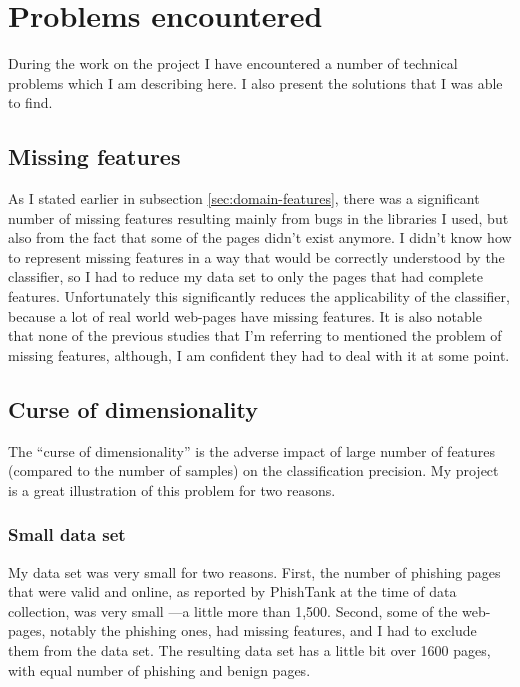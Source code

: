 \documentclass{article}
\begin{document}
\section{Problems encountered}
\label{sec:problems-encountered}

During the work on the project I have encountered a number of
technical problems which I am describing here. I also present the
solutions that I was able to find.

\subsection{Missing features}
\label{sec:missing-features}

As I stated earlier in subsection \ref{sec:domain-features}, there was
a significant number of missing features resulting mainly from bugs in
the libraries I used, but also from the fact that some of the pages
didn't exist anymore. I didn't know how to represent missing features
in a way that would be correctly understood by the classifier, so I
had to reduce my data set to only the pages that had complete
features. Unfortunately this significantly reduces the applicability
of the classifier, because a lot of real world web-pages have missing
features. It is also notable that none of the previous studies that
I'm referring to mentioned the problem of missing features, although,
I am confident they had to deal with it at some point.

\subsection{Curse of dimensionality}
\label{sec:curse-dimensionality}

The ``curse of dimensionality'' is the adverse impact of large number
of features (compared to the number of samples) on the classification
precision. My project is a great illustration of this problem for two
reasons. 

\subsubsection{Small data set}
\label{sec:small-dataset}
My data set was very small for two reasons. First, the number of
phishing pages that were valid and online, as reported by PhishTank at
the time of data collection, was very small ---a little more than
1,500. Second, some of the web-pages, notably the phishing ones, had
missing features, and I had to exclude them from the data set. The
resulting data set has a little bit over 1600 pages, with equal number
of phishing and benign pages.
\end{document}
